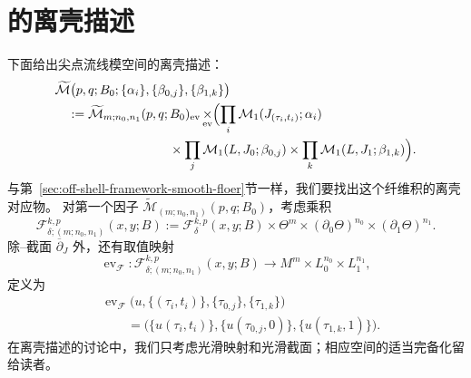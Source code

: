 \section{\termCuspTrajectorySpace{}的离壳描述}
\label{sec:off-shell-cusp-trajectory-spaces}

下面给出尖点流线模空间的离壳描述：
\begin{equation}
\begin{aligned}
 &\widetilde{\mathcal M}\bigl(p,q;B_0;
 \{\alpha_i\},\{\beta_{0,j}\},\{\beta_{1,k}\}\bigr)\\
 &\quad:=\widetilde{\mathcal M}_{m;n_0,n_1}(p,q;B_0)_{\mathrm{ev}}
 \mathop{\times}_{\mathrm{ev}}
 \Bigl(\prod_i\mathcal M_1(J_{(\tau_i,t_i)};\alpha_i)\\
 &\hspace{9em}\times\prod_j\mathcal M_1(L,J_0;\beta_{0,j})
 \times\prod_k\mathcal M_1(L,J_1;\beta_{1,k})\Bigr).
\end{aligned}
\label{eq:ch15-cusp-trajectory-moduli}
\end{equation}
与第~\ref{sec:off-shell-framework-smooth-floer}节一样，我们要找出这个纤维积的离壳对应物。
对第一个因子 $\widetilde{\mathcal M}_{(m;n_0,n_1)}(p,q;B_0)$，考虑乘积
\[
 \mathcal F_{\delta;(m;n_0,n_1)}^{k,p}(x,y;B)
 :=\mathcal F_\delta^{k,p}(x,y;B)\times\Theta^m
 \times(\partial_0\Theta)^{n_0}\times(\partial_1\Theta)^{n_1}.
\]
除\personCauchy{}--\personRiemann{}截面 $\overline\partial_J$ 外，还有取值映射
\[
 \operatorname{ev}_{\mathcal F}:
 \mathcal F_{\delta;(m;n_0,n_1)}^{k,p}(x,y;B)
 \longrightarrow M^m\times L_0^{n_0}\times L_1^{n_1},
\]
定义为
\begin{equation}
\begin{aligned}
 &\operatorname{ev}_{\mathcal F}
 \bigl(u,\{(\tau_i,t_i)\},\{\tau_{0,j}\},\{\tau_{1,k}\}\bigr)\\
 &\qquad=\bigl(\{u(\tau_i,t_i)\},\{u(\tau_{0,j},0)\},
 \{u(\tau_{1,k},1)\}\bigr).
\end{aligned}
\label{eq:off-shell-strip-evaluation}
\end{equation}
在离壳描述的讨论中，我们只考虑光滑映射和光滑截面；相应空间的适当完备化留给读者。


